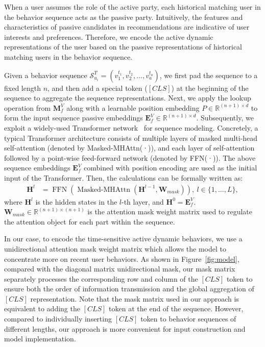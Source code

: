 When a user assumes the role of the active party, each historical matching user in the behavior sequence acts as the passive party.
Intuitively, the features and characteristics of passive candidates in recommendations are indicative of user interests and preferences.
Therefore, we encode the active dynamic representations of the user based on the passive representations of historical matching users in the behavior sequence.

Given a behavior sequence $\mathcal{S}^T_{u_i} = (v^{t_1}_1, v^{t_2}_2,..., v^{t_a}_a)$, we first pad the sequence to a fixed length $n$, and then add a special token ($[CLS]$) at the beginning of the sequence to aggregate the sequence representations. 
Next, we apply the lookup operation from $\bm{M}^{V}_{f}$ along with a learnable position embedding $P \in \mathbb{R}^{(n+1) \times d}$ to form the input sequence passive embeddings $\bm{E}^{V}_{f} \in \mathbb{R}^{(n+1) \times d}$. 
Subsequently, we exploit a widely-used Transformer network~\cite{vaswani2017attention} for sequence modeling. Concretely, a typical Transformer architecture consists of multiple layers of masked multi-head self-attention (denoted by Masked-MHAttn(·)), and each layer of self-attention followed by a point-wise feed-forward network (denoted by FFN(·)). The above sequence embeddings $\bm{E}^{V}_{f}$ combined with position encoding are used as the initial input of the Transformer. Then, the calculations can be formally written as:
\begin{align}
    \bm{H}^{l} & =\operatorname{FFN}\left(\operatorname{Masked-MHAttn}\left(\bm{H}^{l-1}, \bm{W}_{mask}\right)\right), \ l \in\{1, \ldots, L\},
\end{align}
where $\bm{H}^{l}$ is the hidden states in the $l$-th layer, and $\bm{H}^{0} = \bm{E}^{V}_{f}$. $\bm{W}_{mask} \in \mathbb{R}^{(n+1) \times (n+1)}$ is the attention mask weight matrix used to regulate the attention object for each part within the sequence. 

In our case, to encode the time-sensitive active dynamic behaviors, we use a unidirectional attention mask weight matrix which allows the model to concentrate more on recent user behaviors. 
As shown in Figure~\ref{fig:model}, compared with the diagonal matrix unidirectional mask, our mask matrix separately processes the corresponding row and column of the $[CLS]$ token to ensure both the order of information transmission and the global aggregation of $[CLS]$ representation. 
Note that the mask matrix used in our approach is equivalent to adding the $[CLS]$ token at the end of the sequence. However, compared to individually inserting $[CLS]$ token to behavior sequences of different lengths, our approach is more convenient for input construction and model implementation.

